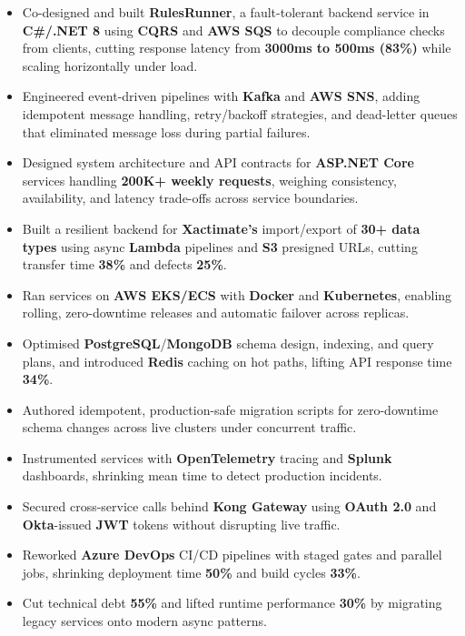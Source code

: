 \documentclass[a4paper,10pt]{article}
\begin{document}
\begin{itemize}[leftmargin=*]
    \item Co-designed and built \textbf{RulesRunner}, a fault-tolerant backend service in \textbf{C\#/.NET 8} using \textbf{CQRS} and \textbf{AWS SQS} to decouple compliance checks from clients, cutting response latency from \textbf{3000ms to 500ms (83\%)} while scaling horizontally under load.
    \item Engineered event-driven pipelines with \textbf{Kafka} and \textbf{AWS SNS}, adding idempotent message handling, retry/backoff strategies, and dead-letter queues that eliminated message loss during partial failures.
    \item Designed system architecture and API contracts for \textbf{ASP.NET Core} services handling \textbf{200K+ weekly requests}, weighing consistency, availability, and latency trade-offs across service boundaries.
    \item Built a resilient backend for \textbf{Xactimate's} import/export of \textbf{30+ data types} using async \textbf{Lambda} pipelines and \textbf{S3} presigned URLs, cutting transfer time \textbf{38\%} and defects \textbf{25\%}.
    \item Ran services on \textbf{AWS EKS/ECS} with \textbf{Docker} and \textbf{Kubernetes}, enabling rolling, zero-downtime releases and automatic failover across replicas.
    \item Optimised \textbf{PostgreSQL}/\textbf{MongoDB} schema design, indexing, and query plans, and introduced \textbf{Redis} caching on hot paths, lifting API response time \textbf{34\%}.
    \item Authored idempotent, production-safe migration scripts for zero-downtime schema changes across live clusters under concurrent traffic.
    \item Instrumented services with \textbf{OpenTelemetry} tracing and \textbf{Splunk} dashboards, shrinking mean time to detect production incidents.
    \item Secured cross-service calls behind \textbf{Kong Gateway} using \textbf{OAuth 2.0} and \textbf{Okta}-issued \textbf{JWT} tokens without disrupting live traffic.
    \item Reworked \textbf{Azure DevOps} CI/CD pipelines with staged gates and parallel jobs, shrinking deployment time \textbf{50\%} and build cycles \textbf{33\%}.
    \item Cut technical debt \textbf{55\%} and lifted runtime performance \textbf{30\%} by migrating legacy services onto modern async patterns.
\end{itemize}
\end{document}

